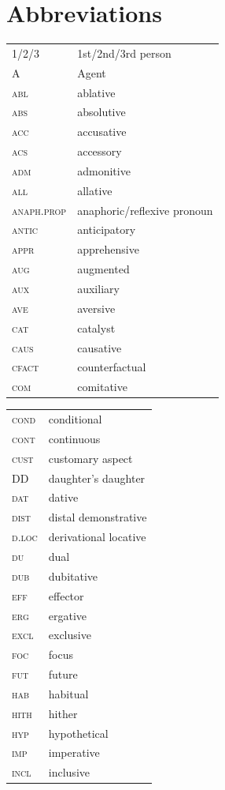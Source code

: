 \documentclass[output=paper,colorlinks,citecolor=brown]{langscibook}
\begin{document}
\section*{Abbreviations}
\begin{tabularx}{.5\textwidth}{@{}lQ@{}}
\textsc{1/2/3} & 1st/2nd/3rd person \\
\textsc{A} & Agent\\
\textsc{abl} & ablative \\
\textsc{abs} & absolutive \\
\textsc{acc} & accusative \\
\textsc{acs} & accessory \\
\textsc{adm} & admonitive\\
\textsc{all} & allative \\
\textsc{anaph.prop} & anaphoric/reflexive pronoun \\
\textsc{antic} & anticipatory\\
\textsc{appr} & apprehensive \\
\textsc{aug} & augmented \\
\textsc{aux} & auxiliary\\
\textsc{ave} & aversive \\
\textsc{cat} & catalyst \\
\textsc{caus} & causative \\
\textsc{cfact} & counterfactual \\
\textsc{com} & comitative \\
\end{tabularx}
\begin{tabularx}{.5\textwidth}{@{}lQ@{}}
\textsc{cond} & conditional \\
\textsc{cont} & continuous \\
\textsc{cust} & customary aspect \\
DD & daughter's daughter\\
\textsc{dat} & dative\\
\textsc{dist} & distal demonstrative\\
\textsc{d.loc} & derivational locative \\
\textsc{du} & dual\\
\textsc{dub} & dubitative \\
\textsc{eff} & effector \\
\textsc{erg} & ergative \\
\textsc{excl} & exclusive \\
\textsc{foc} & focus \\
\textsc{fut} & future \\
\textsc{hab} & habitual\\
\textsc{hith} & hither \\
\textsc{hyp} & hypothetical\\
\textsc{imp} & imperative \\
\textsc{incl} & inclusive\\
\end{tabularx}
\end{document}
